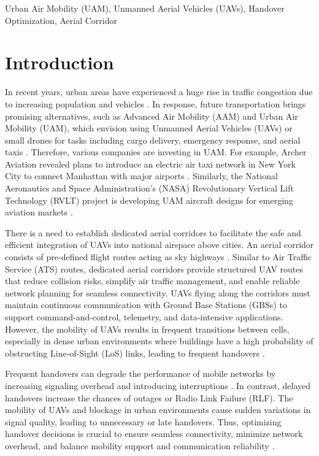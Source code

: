 \documentclass[10pt,conference]{IEEEtran}
\begin{document}
\begin{IEEEkeywords}
Urban Air Mobility (UAM), Unmanned
Aerial Vehicles (UAVs), Handover Optimization, Aerial Corridor
\end{IEEEkeywords}



\section{Introduction}
In recent years, urban areas have experienced a huge rise in traffic congestion due to increasing population and vehicles \cite{10718279}. In response, future transportation brings promising alternatives, such as Advanced Air Mobility (AAM) and Urban Air Mobility (UAM), which envision using Unmanned Aerial Vehicles (UAVs) or small drones for tasks including cargo delivery, emergency response, and aerial taxis \cite{cohen2021urban, 10793277}. Therefore, various companies are investing in UAM. For example, Archer Aviation revealed plans to introduce an electric air taxi network in New York City to connect Manhattan with major airports \cite{archer2025nyc}. Similarly, the National Aeronautics and Space Administration’s (NASA) Revolutionary Vertical Lift Technology (RVLT) project is developing UAM aircraft designs for emerging aviation markets \cite{johnson2022nasa}.

There is a need to establish dedicated aerial corridors to facilitate the safe and efficient integration of UAVs into national airspace above cities. An aerial corridor consists of pre-defined flight routes acting as sky highways \cite{10594734}. Similar to Air Traffic Service (ATS) routes, dedicated aerial corridors provide structured UAV routes that reduce collision risks, simplify air traffic management, and enable reliable network planning for seamless connectivity. UAVs flying along the corridors must maintain continuous communication with Ground Base Stations (GBSs) to support command-and-control, telemetry, and data-intensive applications. However, the mobility of UAVs results in frequent transitions between cells, especially in dense urban environments where buildings have a high probability of obstructing Line-of-Sight (LoS) links, leading to frequent handovers \cite{10746345}.

Frequent handovers can degrade the performance of mobile networks by increasing signaling overhead and introducing interruptions \cite{sonmez2024handover}. In contrast, delayed handovers increase the chances of outages or Radio Link Failure (RLF). The mobility of UAVs and blockage in urban environments cause sudden variations in signal quality, leading to unnecessary or late handovers. Thus, optimizing handover decisions is crucial to ensure seamless connectivity, minimize network overhead, and balance mobility support and communication reliability \cite{ullah2023survey}. 
\end{document}
